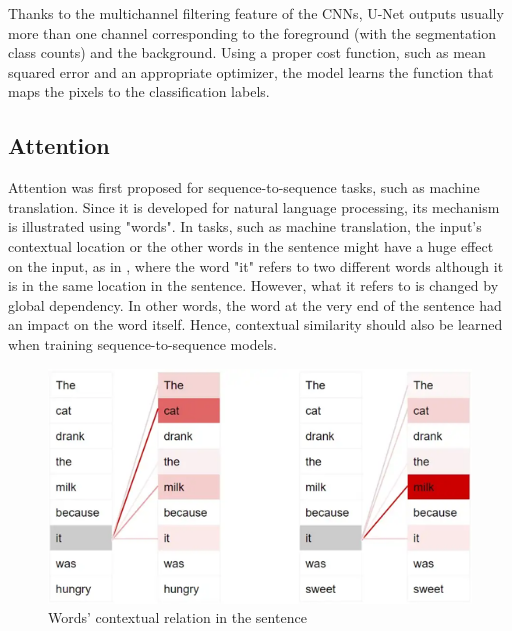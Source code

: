 \documentclass{IEEEtran}
\begin{document}
Thanks to the multichannel filtering feature of the CNNs, U-Net outputs usually more than one channel corresponding to the foreground (with the segmentation class counts)
and the background. Using a proper cost function, such as mean squared error and an appropriate optimizer, the model learns the function that maps the pixels to the classification labels.  

\subsection{Attention}

Attention was first proposed for sequence-to-sequence tasks, such as machine translation. Since it is developed for natural language processing, its mechanism is illustrated using "words". In tasks, such as machine translation, the input's contextual location or the other words in the sentence might have a huge effect on the input, as in , where the word "it" refers to two different words although it is in the same location in the sentence. However, what it refers to is changed by global dependency. In other words, the word at the very end of the sentence had an impact on the word itself. Hence, contextual similarity should also be learned when training sequence-to-sequence models. 
\begin{figure}[h]
\centering
\includegraphics[width=\textwidth]{img/attention.png}
\caption{Words' contextual relation in the sentence \cite{doshi_2021}}\label{fig:attention}
\end{figure}
\end{document}
